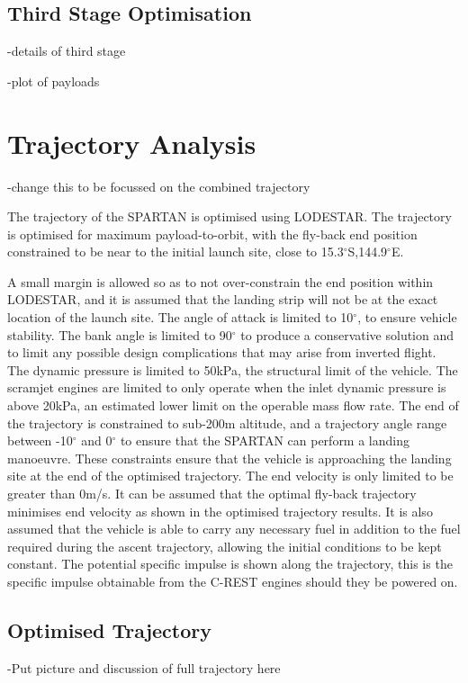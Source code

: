 \documentclass[journal]{new-aiaa} %
\begin{document}
\subsection{Third Stage Optimisation}

-details of third stage

-plot of payloads



\section{Trajectory Analysis}

-change this to be focussed on the combined trajectory


The trajectory of the SPARTAN is optimised using LODESTAR. 
The trajectory is optimised for maximum payload-to-orbit, with the fly-back end position constrained to be near to the initial launch site, close to  15.3$^\circ$S,144.9$^\circ$E\cite{ForbesSpyratos2018}. 

A small margin is allowed so as to not over-constrain the end position within LODESTAR, and it is assumed that the landing strip will not be at the exact location of the launch site. The angle of attack is limited to 10$^\circ$, to ensure vehicle stability. The bank angle is limited to 90$^\circ$ to produce a conservative solution and to limit any possible design complications that may arise from inverted flight. The dynamic pressure is limited to 50kPa, the structural limit of the vehicle. The scramjet engines are limited to only operate when the inlet dynamic pressure is above 20kPa, an estimated lower limit on the operable mass flow rate.
The end of the trajectory is constrained to sub-200m altitude, and a trajectory angle range between -10$^\circ$ and 0$^\circ$ to ensure that the SPARTAN can perform a landing manoeuvre. These constraints ensure that the vehicle is approaching the landing site at the end of the optimised trajectory. The end velocity is only limited to be greater than 0m/s. It can be assumed that the optimal fly-back trajectory minimises end velocity as shown in the optimised trajectory results. 
It is also assumed that the vehicle is able to carry any necessary fuel in addition to the fuel required during the ascent trajectory, allowing the initial conditions to be kept constant. The potential specific impulse is shown along the trajectory, this is the specific impulse obtainable from the C-REST engines should they be powered on.

\subsection{Optimised Trajectory}
-Put picture and discussion of full trajectory here
\end{document}
